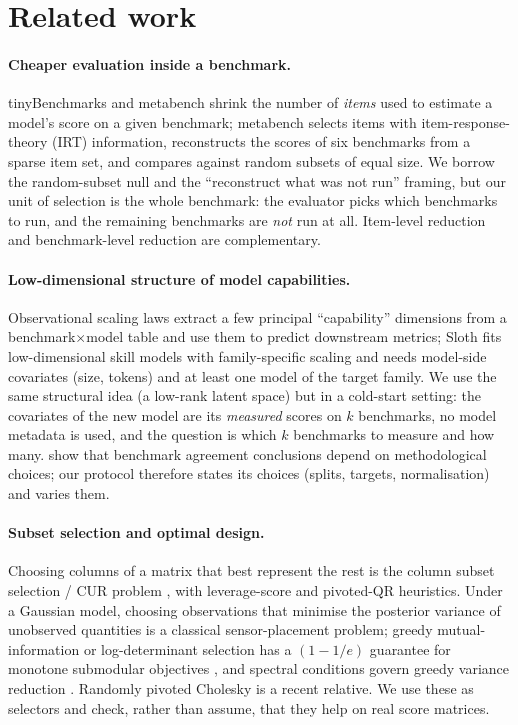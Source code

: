 \section{Related work}
\label{sec:related}
\paragraph{Cheaper evaluation inside a benchmark.}
tinyBenchmarks \citep{polo2024tiny} and metabench \citep{kipnis2024metabench} shrink the number of \emph{items} used to estimate a model's score on a given benchmark; metabench selects items with item-response-theory (IRT) information, reconstructs the scores of six benchmarks from a sparse item set, and compares against random subsets of equal size. We borrow the random-subset null and the ``reconstruct what was not run'' framing, but our unit of selection is the whole benchmark: the evaluator picks which benchmarks to run, and the remaining benchmarks are \emph{not} run at all. Item-level reduction and benchmark-level reduction are complementary.

\paragraph{Low-dimensional structure of model capabilities.}
Observational scaling laws \citep{ruan2024observational} extract a few principal ``capability'' dimensions from a benchmark$\times$model table and use them to predict downstream metrics; Sloth \citep{polo2024sloth} fits low-dimensional skill models with family-specific scaling and needs model-side covariates (size, tokens) and at least one model of the target family. We use the same structural idea (a low-rank latent space) but in a cold-start setting: the covariates of the new model are its \emph{measured} scores on $k$ benchmarks, no model metadata is used, and the question is which $k$ benchmarks to measure and how many. \citet{perlitz2024benchbench} show that benchmark agreement conclusions depend on methodological choices; our protocol therefore states its choices (splits, targets, normalisation) and varies them.

\paragraph{Subset selection and optimal design.}
Choosing columns of a matrix that best represent the rest is the column subset selection / CUR problem \citep{mahoney2009cur}, with leverage-score and pivoted-QR heuristics. Under a Gaussian model, choosing observations that minimise the posterior variance of unobserved quantities is a classical sensor-placement problem; greedy mutual-information or log-determinant selection has a $(1-1/e)$ guarantee for monotone submodular objectives \citep{nemhauser1978analysis,guestrin2005near}, and spectral conditions govern greedy variance reduction \citep{das2011submodular}. Randomly pivoted Cholesky \citep{chen2025rpcholesky} is a recent relative. We use these as selectors and check, rather than assume, that they help on real score matrices.

